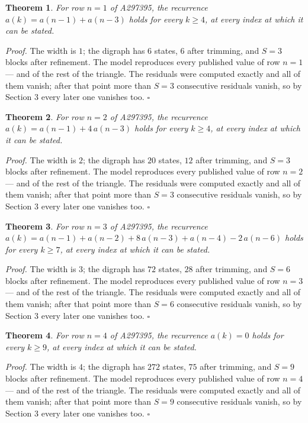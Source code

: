 \documentclass[11pt]{article}
\newtheorem{theorem}{Theorem}
\theoremstyle{definition}
\begin{document}
\begin{theorem} For row $n = 1$ of A297395, the recurrence $a(k) = a(n-1) + a(n-3)$ holds for every $k \ge 4$, at every index at which it can be stated.\end{theorem}

{\itshape Proof.} The width is $1$; the digraph has $6$ states, $6$ after trimming, and $S = 3$ blocks after refinement. The model reproduces every published value of row $n = 1$ --- and of the rest of the triangle. The residuals were computed exactly and all of them vanish; after that point more than $S = 3$ consecutive residuals vanish, so by Section 3 every later one vanishes too. $\square$

\begin{theorem} For row $n = 2$ of A297395, the recurrence $a(k) = a(n-1) + 4\,a(n-3)$ holds for every $k \ge 4$, at every index at which it can be stated.\end{theorem}

{\itshape Proof.} The width is $2$; the digraph has $20$ states, $12$ after trimming, and $S = 3$ blocks after refinement. The model reproduces every published value of row $n = 2$ --- and of the rest of the triangle. The residuals were computed exactly and all of them vanish; after that point more than $S = 3$ consecutive residuals vanish, so by Section 3 every later one vanishes too. $\square$

\begin{theorem} For row $n = 3$ of A297395, the recurrence $a(k) = a(n-1) + a(n-2) + 8\,a(n-3) + a(n-4) - 2\,a(n-6)$ holds for every $k \ge 7$, at every index at which it can be stated.\end{theorem}

{\itshape Proof.} The width is $3$; the digraph has $72$ states, $28$ after trimming, and $S = 6$ blocks after refinement. The model reproduces every published value of row $n = 3$ --- and of the rest of the triangle. The residuals were computed exactly and all of them vanish; after that point more than $S = 6$ consecutive residuals vanish, so by Section 3 every later one vanishes too. $\square$

\begin{theorem} For row $n = 4$ of A297395, the recurrence $a(k) = 0$ holds for every $k \ge 9$, at every index at which it can be stated.\end{theorem}

{\itshape Proof.} The width is $4$; the digraph has $272$ states, $75$ after trimming, and $S = 9$ blocks after refinement. The model reproduces every published value of row $n = 4$ --- and of the rest of the triangle. The residuals were computed exactly and all of them vanish; after that point more than $S = 9$ consecutive residuals vanish, so by Section 3 every later one vanishes too. $\square$
\end{document}
